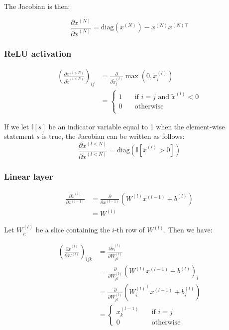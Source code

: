 \documentclass{article}
\begin{document}
The Jacobian is then:

\begin{equation}
\frac{\partial x^{(N)}}{\partial\tilde{x}^{(N)}} =
\text{diag}(x^{(N)})-x^{(N)}{x^{(N)\top}}
\end{equation}

\subsubsection*{ReLU activation}

\begin{align}
\left(\frac{\partial x^{(l<N)}}{\partial\tilde{x}^{(l<N)}}\right)_{ij}
&=
\frac{\partial}{\partial\tilde{x}^{(l)}_j}\max(0,\tilde{x}^{(l)}_i)\\
&=
\left\lbrace
\begin{matrix}
1&\quad\text{if } i = j\text{ and } \tilde{x}^{(l)}<0\\
0&\quad\text{otherwise} \\
\end{matrix}
\right.
\end{align}

If we let $\mathbb{I}[s]$  be an indicator variable equal to 1 when the element-wise statement $s$ is true, the Jacobian can be written as follows:
\begin{equation}
\frac{\partial x^{(l<N)}}{\partial\tilde{x}^{(l<N)}} = \text{diag}(\mathbb{I}[\tilde{x}^{(l)}>0])
\end{equation}

\subsubsection*{Linear layer}


\begin{align}
\frac{\partial\tilde{x}^{(l)}}{\partial x^{(l-1)}}
&=
\frac{\partial}{\partial x^{(l-1)}}(W^{(l)}x^{(l-1)}+b^{(l)})\\
&= W^{(l)}
\end{align}



Let $W^{(l)}_{i:}$ be a slice containing the $i$-th row of $W^{(l)}$. Then we have:

\begin{align}
\left(\frac{\partial\tilde{x}^{(l)}}{\partial W^{(l)}}\right)_{ijk}
&= \frac{\partial\tilde{x}^{(l)}_i}{\partial W^{(l)}_{jk}}\\
&=
\frac{\partial}{\partial W^{(l)}_{jk}}(W^{(l)}x^{(l-1)}+b^{(l)})_i \\
&=
\frac{\partial}{\partial W^{(l)}_{jk}}({W^{(l)}_{i:}}^\top x^{(l-1)}+b^{(l)}_i) \\
&=
\left\lbrace
\begin{matrix}
x^{(l-1)}_k\quad &\text{if } i = j\\
0\quad &\text{otherwise}
\end{matrix}
\right.
\end{align}
\end{document}
